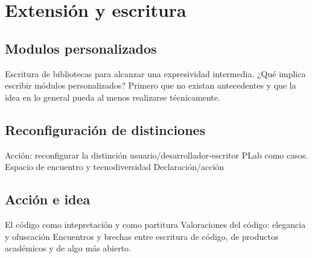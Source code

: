 \chapter{Extensión y escritura}

\section{Modulos personalizados}

Escritura de bibliotecas para alcanzar una expresividad intermedia.
¿Qué implica escribir módulos personalizados?
Primero que no existan antecedentes y que la idea en lo general pueda al menos realizarse técnicamente.

\section{Reconfiguración de distinciones}

Acción: reconfigurar la distinción usuario/desarrollador-escritor
PLab como casos. Espacio de encuentro y tecnodiversidad
Declaración/acción

\section{Acción e idea}

El código como intepretación y como partitura
Valoraciones del código: elegancia y ofuscación
Encuentros y brechas entre escritura de código, de productos académicos y de algo más abierto.
